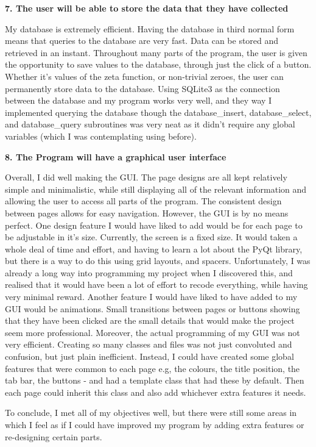 \documentclass[12pt]{article}
\begin{document}
\textbf{7. The user will be able to store the data that they have collected}

My database is extremely efficient. Having the database in third normal form means that queries to the database are very fast. Data can be stored and retrieved in an instant. Throughout many parts of the program, the user is given the opportunity to save values to the database, through just the click of a button. Whether it's values of the zeta function, or non-trivial zeroes, the user can permanently store data to the database. Using SQLite3 as the connection between the database and my program works very well, and they way I implemented querying the database though the database\_insert, database\_select, and database\_query subroutines was very neat as it didn't require any global variables (which I was contemplating using before).


\textbf{8. The Program will have a graphical user interface}

Overall, I did well making the GUI. The page designs are all kept relatively simple and minimalistic, while still displaying all of the relevant information and allowing the user to access all parts of the program. The consistent design between pages allows for easy navigation. However, the GUI is by no means perfect. One design feature I would have liked to add would be for each page to be adjustable in it's size. Currently, the screen is a fixed size. It would taken a whole deal of time and effort, and having to learn a lot about the PyQt library, but there is a way to do this using grid layouts, and spacers. Unfortunately, I was already a long way into programming my project when I discovered this, and realised that it would have been a lot of effort to recode everything, while having very minimal reward. Another feature I would have liked to have added to my GUI would be animations. Small transitions between pages or buttons showing that they have been clicked are the small details that would make the project seem more professional. Moreover, the actual programming of my GUI was not very efficient. Creating so many classes and files was not just convoluted and confusion, but just plain inefficient. Instead, I could have created some global features that were common to each page e.g, the colours, the title position, the tab bar, the buttons - and had a template class that had these by default. Then each page could inherit this class and also add whichever extra features it needs.

To conclude, I met all of my objectives well, but there were still some areas in which I feel as if I could have improved my program by adding extra features or re-designing certain parts.
\end{document}

